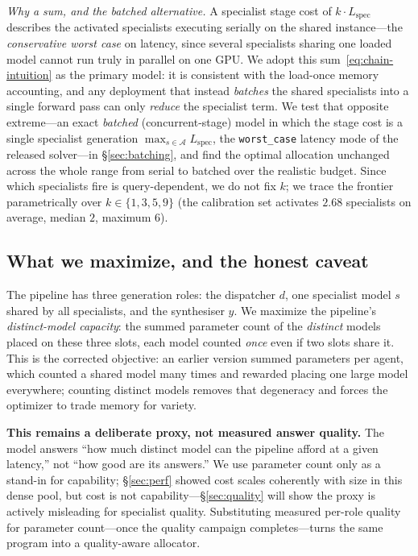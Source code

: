 \documentclass[11pt]{article}
\begin{document}
\emph{Why a sum, and the batched alternative.} A specialist stage cost of
$k\cdot L_{\text{spec}}$ describes the activated specialists executing serially on the
shared instance---the \emph{conservative worst case} on latency, since several
specialists sharing one loaded model cannot run truly in parallel on one GPU. We
adopt this sum~\eqref{eq:chain-intuition} as the primary model: it is consistent with
the load-once memory accounting, and any deployment that instead \emph{batches} the
shared specialists into a single forward pass can only \emph{reduce} the specialist
term. We test that opposite extreme---an exact \emph{batched} (concurrent-stage)
model in which the stage cost is a single specialist generation $\max_{s\in\mathcal{A}}
L_{\text{spec}}$, the \texttt{worst\_case} latency mode of the released solver---in
§\ref{sec:batching}, and find the optimal allocation unchanged across the whole range
from serial to batched over the realistic budget. Since which specialists fire is
query-dependent, we do not fix $k$; we trace the frontier parametrically over
$k\in\{1,3,5,9\}$ (the calibration set activates $2.68$ specialists on average,
median $2$, maximum $6$).

\subsection{What we maximize, and the honest caveat}
The pipeline has three generation roles: the dispatcher $d$, one specialist model
$s$ shared by all specialists, and the synthesiser $y$. We maximize the
pipeline's \emph{distinct-model capacity}: the summed parameter count of the
\emph{distinct} models placed on these three slots, each model counted
\emph{once} even if two slots share it. This is the corrected objective: an
earlier version summed parameters per agent, which counted a shared model many
times and rewarded placing one large model everywhere; counting distinct models
removes that degeneracy and forces the optimizer to trade memory for variety.

\textbf{This remains a deliberate proxy, not measured answer quality.} The model
answers ``how much distinct model can the pipeline afford at a given latency,''
not ``how good are its answers.'' We use parameter count only as a stand-in for
capability; §\ref{sec:perf} showed cost scales coherently with size in this dense
pool, but cost is not capability---§\ref{sec:quality} will show the proxy is
actively misleading for specialist quality. Substituting measured per-role quality for parameter
count---once the quality campaign completes---turns the same program into a
quality-aware allocator.
\end{document}
